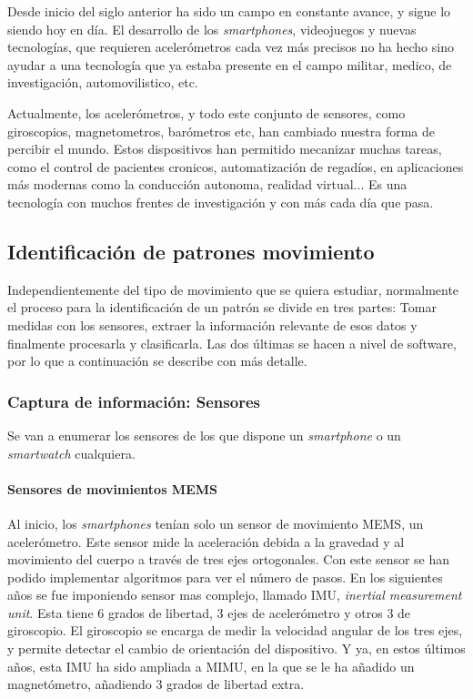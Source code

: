 \documentclass[12pt]{article}
\numberwithin{equation}{section}
\begin{document}
{Desde inicio del siglo anterior ha sido un campo en constante avance, y sigue lo siendo hoy en día. El desarrollo de los \textit{smartphones}, videojuegos y nuevas tecnologías, que requieren acelerómetros cada vez más precisos no ha hecho sino ayudar a una tecnología que ya estaba presente en el campo militar, medico, de investigación, automovilistico, etc. 

Actualmente, los acelerómetros, y todo este conjunto de sensores, como giroscopios, magnetometros, barómetros etc, han cambiado nuestra forma de percibir el mundo. Estos dispositivos han permitido mecanizar muchas tareas, como el control de pacientes cronicos, automatización de regadíos, en aplicaciones más modernas como la conducción autonoma, realidad virtual... Es una tecnología con muchos frentes de investigación y con más cada día que pasa.

\subsection{Identificación de patrones movimiento}
Independientemente del tipo de movimiento que se quiera estudiar, normalmente el proceso para la identificación de un patrón se divide en tres partes: Tomar medidas con los sensores, extraer la información relevante de esos datos y finalmente procesarla y clasificarla. Las dos últimas se hacen a nivel de software, por lo que a continuación se describe con más detalle.

\subsubsection{Captura de información: Sensores}
Se van a enumerar los sensores de los que dispone un \textit{smartphone} o un \textit{smartwatch} cualquiera.

\paragraph{Sensores de movimientos MEMS}

Al inicio, los \textit{smartphones} tenían solo un sensor de movimiento MEMS, un acelerómetro. Este sensor mide la aceleración debida a la gravedad y al movimiento del cuerpo a través de tres ejes ortogonales. Con este sensor se han podido implementar algoritmos para ver el número de pasos. En los siguientes años se fue imponiendo sensor mas complejo, llamado IMU, \textit{inertial measurement unit}. Esta tiene 6 grados de libertad, 3 ejes de acelerómetro y otros 3 de giroscopio. El giroscopio se encarga de medir la velocidad angular de los tres ejes, y permite detectar el cambio de orientación del dispositivo. Y ya, en estos últimos años, esta IMU ha sido ampliada a MIMU, en la que se le ha añadido un magnetómetro, añadiendo 3 grados de libertad extra.

}
\end{document}

